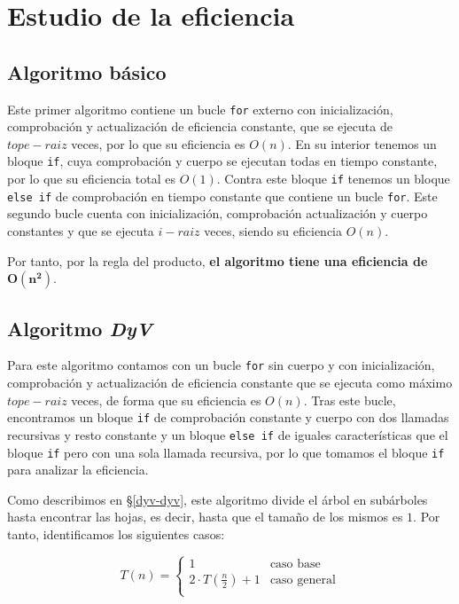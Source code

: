 \section{Estudio de la eficiencia}\label{dyv-eficiencia}

\subsection{Algoritmo básico}\label{dyv-eficiencia-basico}

Este primer algoritmo contiene un bucle \texttt{for} externo con inicialización, comprobación y actualización de eficiencia constante, que se ejecuta de $tope-raiz$ veces, por lo que su eficiencia es $O(n)$.
En su interior tenemos un bloque \texttt{if}, cuya comprobación y cuerpo se ejecutan todas en tiempo constante, por lo que su eficiencia total es $O(1)$.
Contra este bloque \texttt{if} tenemos un bloque \texttt{else if} de comprobación en tiempo constante que contiene un bucle \texttt{for}.
Este segundo bucle cuenta con inicialización, comprobación actualización y cuerpo constantes y que se ejecuta $i-raiz$ veces, siendo su eficiencia $O(n)$.

Por tanto, por la regla del producto, \textbf{el algoritmo tiene una eficiencia de} $\boldsymbol{O(n^2)}$.

\subsection{Algoritmo \textit{DyV}}\label{dyv-eficiencia-dyv}

Para este algoritmo contamos con un bucle \texttt{for} sin cuerpo y con inicialización, comprobación y actualización de eficiencia constante que se ejecuta como máximo $tope-raiz$ veces, de forma que su eficiencia es $O(n)$.
Tras este bucle, encontramos un bloque \texttt{if} de comprobación constante y cuerpo con dos llamadas recursivas y resto constante y un bloque \texttt{else if} de iguales características que el bloque \texttt{if} pero con una sola llamada recursiva, por lo que tomamos el bloque \texttt{if} para analizar la eficiencia.

Como describimos en \S\ref{dyv-dyv}, este algoritmo divide el árbol en subárboles hasta encontrar las hojas, es decir, hasta que el tamaño de los mismos es $1$.
Por tanto, identificamos los siguientes casos:

\[
T(n)=
\begin{cases}
	1                       & \text{caso base}    \\
	2\cdot T(\frac{n}{2})+1 & \text{caso general} \\
\end{cases}
\]

